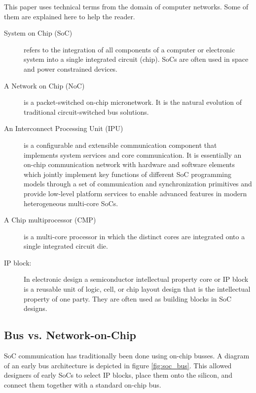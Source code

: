 This paper uses technical terms from the domain of computer networks. 
Some of them are explained here to help the reader.

\begin{description}

\item[System on Chip (SoC)] 
	
refers to the integration of all components of a computer or electronic system into a single integrated circuit (chip). SoCs are often used in space and power constrained devices.
	
\item[A Network on Chip (NoC)] 

is a packet-switched on-chip micronetwork. 
It is the natural evolution of traditional circuit-switched bus solutions. 
	
\item[An Interconnect Processing Unit (IPU)] 
	
is a configurable and extensible communication component that implements system services and core communication. 
It is essentially an on-chip communication network with hardware and software elements which jointly implement key functions of different SoC programming models through a set of communication and synchronization primitives and provide low-level platform services to enable advanced features in modern heterogeneous multi-core SoCs.\cite{coppola2008design}

\item[A Chip multiprocessor (CMP)] 

is a multi-core processor in which the distinct cores are integrated onto a single integrated circuit die.

\item[IP block:] 
	
In electronic design a semiconductor intellectual property core or IP block is a reusable unit of logic, cell, or chip layout design that is the intellectual property of one party. 
They are often used as building blocks in SoC designs.

\end{description}

\subsection{Bus vs. Network-on-Chip}\label{S:busvsnoc}

SoC communication has traditionally been done using on-chip busses. 
A diagram of an early bus architecture is depicted in figure \ref{fig:soc_bus}. 
This allowed designers of early SoCs to select IP blocks, place them onto the silicon, and connect them together with a standard on-chip bus.

